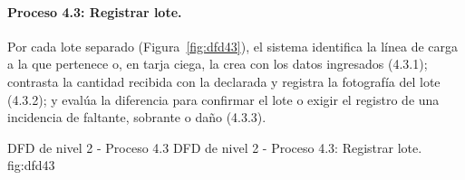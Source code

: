 \paragraph{Proceso 4.3: Registrar lote.} Por cada lote separado (Figura~\ref{fig:dfd43}), el
sistema identifica la línea de carga a la que pertenece o, en tarja ciega, la crea con los
datos ingresados (4.3.1); contrasta la cantidad recibida con la declarada y registra la
fotografía del lote (4.3.2); y evalúa la diferencia para confirmar el lote o exigir el
registro de una incidencia de faltante, sobrante o daño (4.3.3).

    {DFD de nivel 2 - Proceso 4.3}
    {DFD de nivel 2 - Proceso 4.3: Registrar lote.}
    {fig:dfd43}
